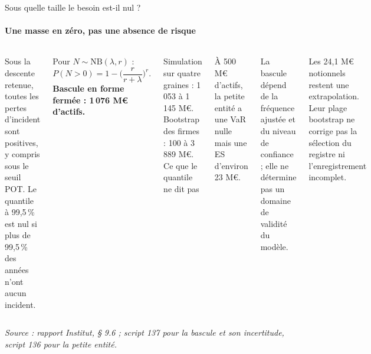 \documentclass[aspectratio=169,10pt,t]{beamer}
\newcommand{\source}[1]{\par\vfill{\tiny\color{gris}\textit{Source : #1}}\par\vspace{-1mm}}
\begin{document}
\begin{frame}{Sous quelle taille le besoin est-il nul ?}
  \framesubtitle{\ajout Une masse en zéro, pas une absence de risque}
  \begin{columns}[T,onlytextwidth]
    \footnotesize
    Sous la descente retenue, toutes les pertes d'incident sont positives, y compris sous le seuil POT. Le quantile à 99,5\,\% est nul si plus de 99,5\,\% des années n'ont aucun incident.\par\vspace{1.5mm}
    Pour $N\sim\mathrm{NB}(\lambda,r)$ :
    \[P(N>0)=1-\Big(\frac{r}{r+\lambda}\Big)^r.\]
    \textbf{Bascule en forme fermée : 1\,076 M€ d'actifs.}\par\vspace{1.5mm}
    Simulation sur quatre graines : 1\,053 à 1\,145 M€. Bootstrap des firmes : 100 à 3\,889 M€.
    \footnotesize
    {\editorial\normalsize Ce que le quantile ne dit pas}\par\vspace{1.5mm}
    À 500 M€ d'actifs, la petite entité a une VaR nulle mais une ES d'environ 23 M€.\par\vspace{1.5mm}
    La bascule dépend de la fréquence ajustée et du niveau de confiance ; elle ne détermine pas un domaine de validité du modèle.\par\vspace{1.5mm}
    {\color{accent}Les 24,1 M€ notionnels restent une extrapolation.} Leur plage bootstrap ne corrige pas la sélection du registre ni l'enregistrement incomplet.
  \end{columns}
  \source{rapport Institut, § 9.6 ; script 137 pour la bascule et son incertitude, script 136 pour la petite entité.}
\end{frame}
\end{document}

